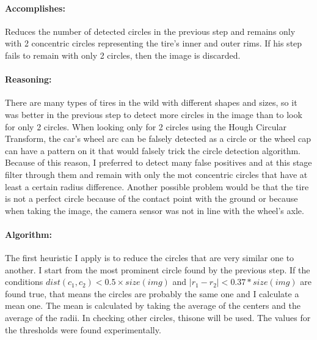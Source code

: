 \paragraph*{Accomplishes:}\mbox{}\par
Reduces the number of detected circles in the previous step and remains only with 2 concentric circles representing the tire's inner and outer rims. If his step fails to remain with only 2 circles, then the image is discarded.

\paragraph*{Reasoning:}\mbox{}\par
There are many types of tires in the wild with different shapes and sizes, so it was better in the previous step to detect more circles in the image than to look for only 2 circles. When looking only for 2 circles using the Hough Circular Transform, the car's wheel arc can be falsely detected as a circle or the wheel cap can have a pattern on it that would falsely trick the circle detection algorithm. Because of this reason, I preferred to detect many false positives and at this stage filter through them and remain with only the mot concentric circles that have at least a certain radius difference. Another possible problem would be that the tire is not a perfect circle because of the contact point with the ground or because when taking the image, the camera sensor was not in line with the wheel's axle.

\paragraph*{Algorithm:}\mbox{}\par
The first heuristic I apply is to reduce the circles that are very similar one to another. I start from the most prominent circle found by the previous step. If the conditions $dist(c_1, c_2) < 0.5 \times size(img)$ and $\Big|r_1 - r_2\Big| < 0.37 * size(img)$ are found true, that means the circles are probably the same one and I calculate a mean one. The mean is calculated by taking the average of the centers and the average of the radii. In checking other circles, thisone will be used. The values for the thresholds were found experimentally.

